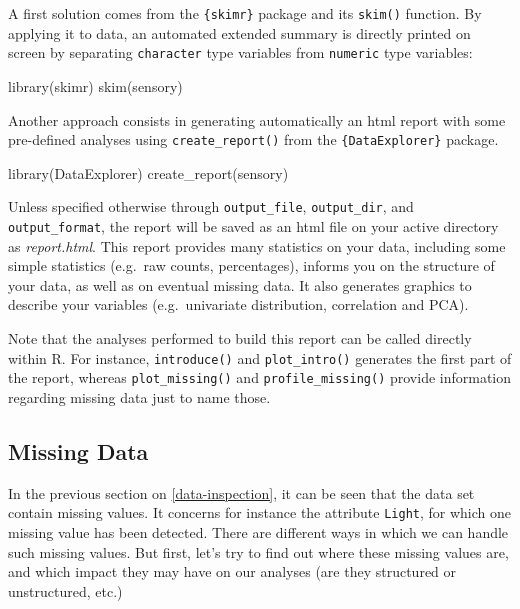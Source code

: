 \documentclass[
]{krantz}
\makeatletter
\newenvironment{Shaded}{\begin{snugshade}}{\end{snugshade}}
\newcommand{\FunctionTok}[1]{\textcolor[rgb]{0,0,0}{#1}}
\newcommand{\NormalTok}[1]{#1}
\renewenvironment{quote}{\begin{VF}}{\end{VF}}
\newenvironment{kframe}{%
\medskip{}
\setlength{\fboxsep}{.8em}
 \def\at@end@of@kframe{}%
 \ifinner\ifhmode%
  \def\at@end@of@kframe{\end{minipage}}%
  \begin{minipage}{\columnwidth}%
 \fi\fi%
 \def\FrameCommand##1{\hskip\@totalleftmargin \hskip-\fboxsep
 \colorbox{shadecolor}{##1}\hskip-\fboxsep
     \hskip-\linewidth \hskip-\@totalleftmargin \hskip\columnwidth}%
 \MakeFramed {\advance\hsize-\width
   \@totalleftmargin\z@ \linewidth\hsize
   \@setminipage}}%
 {\par\unskip\endMakeFramed%
 \at@end@of@kframe}
\renewenvironment{Shaded}{\begin{kframe}}{\end{kframe}}
\makeatother
\begin{document}
A first solution comes from the \texttt{\{skimr\}} package and its \texttt{skim()} function. By applying it to data, an automated extended summary is directly printed on screen by separating \texttt{character} type variables from \texttt{numeric} type variables:

\begin{Shaded}
\begin{Highlighting}[]
\FunctionTok{library}\NormalTok{(skimr)}
\FunctionTok{skim}\NormalTok{(sensory)}
\end{Highlighting}
\end{Shaded}

Another approach consists in generating automatically an html report with some pre-defined analyses using \texttt{create\_report()} from the \texttt{\{DataExplorer\}} package.

\begin{Shaded}
\begin{Highlighting}[]
\FunctionTok{library}\NormalTok{(DataExplorer)}
\FunctionTok{create\_report}\NormalTok{(sensory)}
\end{Highlighting}
\end{Shaded}

Unless specified otherwise through \texttt{output\_file}, \texttt{output\_dir}, and \texttt{output\_format}, the report will be saved as an html file on your active directory as \emph{report.html}. This report provides many statistics on your data, including some simple statistics (e.g.~raw counts, percentages), informs you on the structure of your data, as well as on eventual missing data. It also generates graphics to describe your variables (e.g.~univariate distribution, correlation and PCA).

\begin{quote}
Note that the analyses performed to build this report can be called directly within R. For instance, \texttt{introduce()} and \texttt{plot\_intro()} generates the first part of the report, whereas \texttt{plot\_missing()} and \texttt{profile\_missing()} provide information regarding missing data just to name those.
\end{quote}

\hypertarget{missing-data}{%
\subsection{Missing Data}\label{missing-data}}

In the previous section on \ref{data-inspection}, it can be seen that the data set contain missing values. It concerns for instance the attribute \texttt{Light}, for which one missing value has been detected. There are different ways in which we can handle such missing values. But first, let's try to find out where these missing values are, and which impact they may have on our analyses (are they structured or unstructured, etc.)
\end{document}
